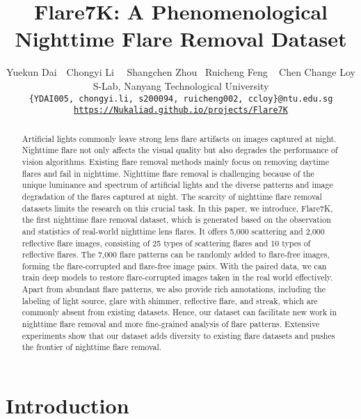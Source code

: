 \documentclass{article}
\title{Flare7K: A Phenomenological Nighttime Flare Removal Dataset}
\author{
Yuekun Dai$\,\,\,\,$ Chongyi Li $\,\,\,\,$ Shangchen Zhou $\,\,\, $Ruicheng Feng $\,\,\, $ Chen Change Loy \\
S-Lab, Nanyang Technological University \\
\texttt{\small \{YDAI005, chongyi.li, s200094, ruicheng002, ccloy\}@ntu.edu.sg}\\ \vspace{2mm}
{\tt\small \url{https://Nukaliad.github.io/projects/Flare7K}}
}
\newcommand{\N}{Flare7K}
\begin{document}
\maketitle


\vspace{-7mm}
\begin{abstract}
\vspace{-4mm}
Artificial lights commonly leave strong lens flare artifacts on images captured at night. 
Nighttime flare not only affects the visual quality but also degrades the performance of vision algorithms. 
Existing flare removal methods mainly focus on removing daytime flares and fail in nighttime.
Nighttime flare removal is challenging because of the unique luminance and spectrum of artificial lights and the diverse patterns and image degradation of the flares captured at night.
The scarcity of nighttime flare removal datasets limits the research on this crucial task.  
In this paper, we introduce, \N, the first nighttime flare removal dataset, which is generated based on the observation and statistics of real-world nighttime lens flares.
It offers 5,000 scattering and 2,000 reflective flare images, consisting of 25 types of scattering flares and 10 types of reflective flares. 
The 7,000 flare patterns can be randomly added to flare-free images, forming the flare-corrupted and flare-free image pairs. 
With the paired data, we can train deep models to restore flare-corrupted images taken in the real world effectively.
Apart from abundant flare patterns, we also provide rich annotations, including the labeling of light source, glare with shimmer, reflective flare, and streak, which are commonly absent from existing datasets.
Hence, our dataset can facilitate new work in nighttime flare removal and more fine-grained analysis of flare patterns. 
Extensive experiments show that our dataset adds diversity to existing flare datasets and pushes the frontier of nighttime flare removal. 


\end{abstract}

\vspace{-5mm}
\section{Introduction}
\vspace{-4mm}
\end{document}

